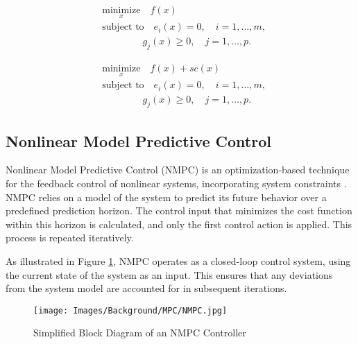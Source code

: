 \begin{minipage}[t]{0.45\textwidth}
    \begin{equation}
        \begin{aligned}
            &\underset{x}{\text{minimize}} \quad f(x) \\
            &\text{subject to} \quad e_i(x) = 0, \quad i = 1, \dots, m, \\
            &\quad \quad \quad \quad \, g_j(x) \geq 0, \quad j = 1, \dots, p.
        \end{aligned}
        \label{eq:optimization_problem}
    \end{equation}
\end{minipage}%
\hfill
\begin{minipage}[t]{0.45\textwidth}
    \begin{equation}
        \begin{aligned}
            &\underset{x}{\text{minimize}} \quad f(x) + sc(x) \\
            &\text{subject to} \quad e_i(x) = 0, \quad i = 1, \dots, m, \\
            &\quad \quad \quad \quad \, g_j(x) \geq 0, \quad j = 1, \dots, p.
        \end{aligned}
        \label{eq:optimization_problem_with_soft_constraint}
    \end{equation}
\end{minipage}

\subsection{Nonlinear Model Predictive Control}

Nonlinear Model Predictive Control (NMPC) is an optimization-based technique for the feedback control of nonlinear systems, incorporating system constraints \cite{grune2017nonlinearmpc}. NMPC relies on a model of the system to predict its future behavior over a predefined prediction horizon. The control input that minimizes the cost function within this horizon is calculated, and only the first control action is applied. This process is repeated iteratively.

As illustrated in Figure \ref{fig:simplified_mpc_control_loop}, NMPC operates as a closed-loop control system, using the current state of the system as an input. This ensures that any deviations from the system model are accounted for in subsequent iterations.

\begin{figure}[h]
    \centering
    \texttt{[image: Images/Background/MPC/NMPC.jpg]}
    \caption{Simplified Block Diagram of an NMPC Controller}
    \label{fig:simplified_mpc_control_loop}
\end{figure}

